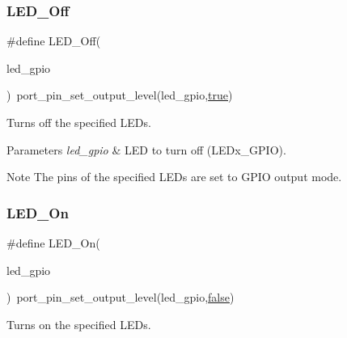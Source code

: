 \mbox{\label{group__samd21__xplained__pro__group_ga4b0995a1d0a6a7bcbaf9f4096cc633c7}} 
\subsubsection{\texorpdfstring{LED\_Off}{LED\_Off}}
{\footnotesize\ttfamily \#define L\+E\+D\+\_\+\+Off(\begin{DoxyParamCaption}\item[{}]{led\+\_\+gpio }\end{DoxyParamCaption})~port\+\_\+pin\+\_\+set\+\_\+output\+\_\+level(led\+\_\+gpio,\mbox{\hyperlink{group__group__sam0__utils_ga41f9c5fb8b08eb5dc3edce4dcb37fee7}{true}})}



Turns off the specified L\+E\+Ds. 


\begin{DoxyParams}{Parameters}
{\em led\+\_\+gpio} & L\+ED to turn off (L\+E\+Dx\+\_\+\+G\+P\+IO).\\
\hline
\end{DoxyParams}
\begin{DoxyNote}{Note}
The pins of the specified L\+E\+Ds are set to G\+P\+IO output mode. 
\end{DoxyNote}
\mbox{\label{group__samd21__xplained__pro__group_ga589335327be57d2761bfa96c55d62f29}} 
\subsubsection{\texorpdfstring{LED\_On}{LED\_On}}
{\footnotesize\ttfamily \#define L\+E\+D\+\_\+\+On(\begin{DoxyParamCaption}\item[{}]{led\+\_\+gpio }\end{DoxyParamCaption})~port\+\_\+pin\+\_\+set\+\_\+output\+\_\+level(led\+\_\+gpio,\mbox{\hyperlink{group__group__sam0__utils_ga65e9886d74aaee76545e83dd09011727}{false}})}



Turns on the specified L\+E\+Ds. 


